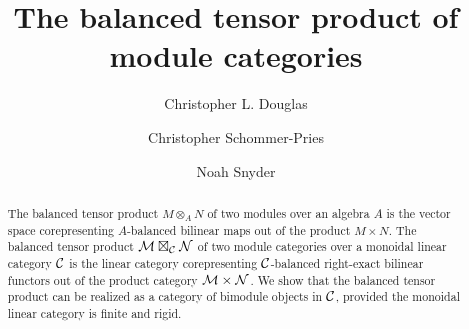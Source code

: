 \documentclass{amsart}
\begin{document}
\title{The balanced tensor product of module categories}

\begin{abstract}
The balanced tensor product $M \otimes_A N$ of two modules over an algebra $A$ is the vector space corepresenting $A$-balanced bilinear maps out of the product $M \times N$.  The balanced tensor product $\mathcal M \boxtimes_{\mathcal C} \mathcal N$ of two module categories over a monoidal linear category $\mathcal C$ is the linear category corepresenting $\mathcal C$-balanced right-exact bilinear functors out of the product category $\mathcal M \times \mathcal N$.  We show that the balanced tensor product can be realized as a category of bimodule objects in $\mathcal C$, provided the monoidal linear category is finite and rigid.
\end{abstract}





\author{Christopher L. Douglas}
\address{Mathematical Institute\\ University of Oxford\\ Oxford OX1 3LB\\ United Kingdom}
      	
\author{Christopher Schommer-Pries}
\address{Department of Mathematics\\ Max Planck Institute for Mathematics \\ 53111 Bonn \\ Germany}

\author{Noah Snyder}
\address{Department of Mathematics\\ Indiana University\\ Bloomington, IN 47401\\ USA}
\end{document}
